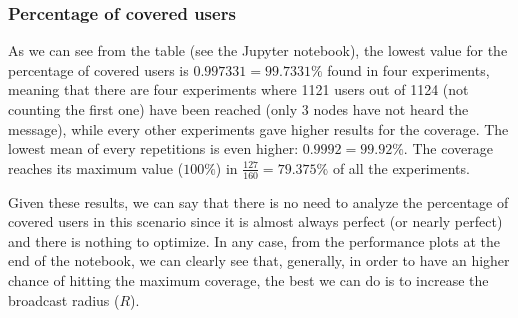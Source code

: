 \subsubsection{Percentage of covered users}\label{subsubsec:hd2krcoverage}

As we can see from the table (see the Jupyter notebook), the lowest value for
the percentage of covered users is \(0.997331\!=\!99.7331\%\) found in four
experiments, meaning that there are four experiments where 1121 users out of
1124 (not counting the first one) have been reached (only 3 nodes have not heard
the message), while every other experiments gave higher results for the
coverage. The lowest mean of every repetitions is even higher:
\(0.9992\!=\!99.92\%\). The coverage reaches its maximum value (\(100\%\)) in
\(\frac{127}{160}\!=\!79.375\%\) of all the experiments.

Given these results, we can say that there is no need to analyze the percentage
of covered users in this scenario since it is almost always perfect (or nearly
perfect) and there is nothing to optimize. In any case, from the performance
plots at the end of the notebook, we can clearly see that, generally, in order
to have an higher chance of hitting the maximum coverage, the best we can do is
to increase the broadcast radius (\(R\)).
